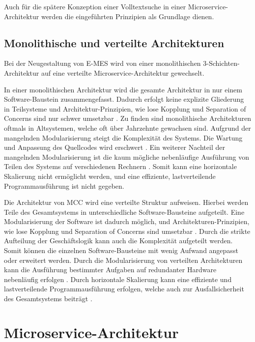 Auch für die spätere Konzeption einer Volltextsuche in einer Microservice-Architektur werden die eingeführten Prinzipien als Grundlage dienen.

\subsection{Monolithische und verteilte Architekturen\label{subsec2.2.2:Unterunterpunkt-2}}

Bei der Neugestaltung von E-MES wird von einer monolithischen 3-Schichten-Architektur auf eine verteilte Microservice-Architektur gewechselt.

In einer monolithischen Architektur wird die gesamte Architektur in nur einem Software-Baustein zusammengefasst. Dadurch erfolgt keine explizite Gliederung in Teilsysteme und Architektur-Prinzipien, wie lose Kopplung und Separation of Concerns sind nur schwer umsetzbar \cite[S. 216]{Vogel.2009}. Zu finden sind monolithische Architekturen oftmals in Altsystemen, welche oft über Jahrzehnte gewachsen sind. Aufgrund der mangelnden Modularisierung steigt die Komplexität des Systems. Die Wartung und Anpassung des Quellcodes wird erschwert \cite{Prof.Dr.AndreasFink.2012b}. Ein weiterer Nachteil der mangelnden Modularisierung ist die kaum mögliche nebenläufige Ausführung von Teilen des Systems auf verschiedenen Rechnern \cite{Prof.Dr.AndreasFink.2012b}. Somit kann eine horizontale Skalierung nicht ermöglicht werden, und eine effiziente, lastverteilende Programmausführung ist nicht gegeben.

Die Architektur von MCC wird eine verteilte Struktur aufweisen. Hierbei werden Teile des Gesamtsystems in unterschiedliche Software-Bausteine aufgeteilt. Eine Modularisierung der Software ist dadurch möglich, und Architekturen-Prinzipien, wie lose Kopplung und Separation of Concerns sind umsetzbar \cite{Vogel.2009}. Durch die strikte Aufteilung der Geschäftslogik kann auch die Komplexität aufgeteilt werden. Somit können die einzelnen Software-Bausteine mit wenig Aufwand angepasst oder erweitert werden. Durch die Modularisierung von verteilten Architekturen kann die Ausführung bestimmter Aufgaben auf redundanter Hardware nebenläufig erfolgen \cite{Prof.Dr.AndreasFink.2012}. Durch horizontale Skalierung kann eine effiziente und lastverteilende Programmausführung erfolgen, welche auch zur Ausfallsicherheit des Gesamtsystems beiträgt \cite{Prof.Dr.AndreasFink.2012}.

\section{Microservice-Architektur\label{sec2.3:Unterpunkt-3}}

